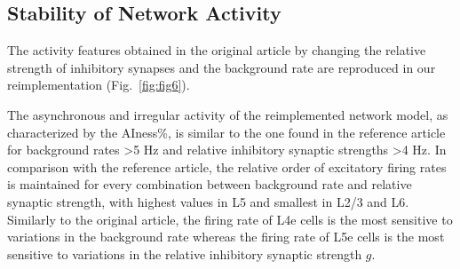 \documentclass[10pt,a4paper,onecolumn]{article}
\begin{document}
\subsection{Stability of Network Activity}

The activity features obtained in the original article by changing the relative strength of inhibitory synapses and the background rate are reproduced in our reimplementation (Fig.~\ref{fig:fig6}). 

The asynchronous and irregular activity of the reimplemented network model, as characterized by the AIness\%, is similar to the one found in the reference article for background rates >5 Hz and relative inhibitory synaptic strengths >4 Hz. In comparison with the reference article, the relative order of excitatory firing rates is maintained for every combination between background rate and relative synaptic strength, with highest values in L5 and smallest in L2/3 and L6. Similarly to the original article, the firing rate of L4e cells is the most sensitive to variations in the background rate whereas the firing rate of L5e cells is the most sensitive to variations in the relative inhibitory synaptic strength $g$.   
 
\end{document}
